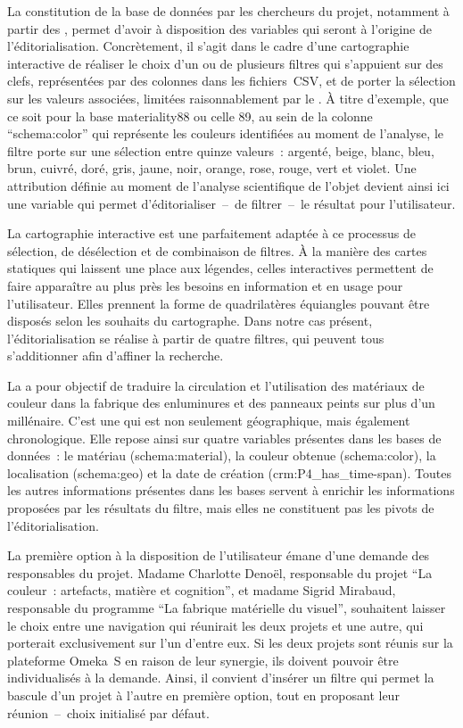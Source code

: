 La constitution de la base de données par les chercheurs du projet, notamment à partir des , permet d’avoir à disposition des variables qui seront à l’origine de l’éditorialisation. Concrètement, il s’agit dans le cadre d’une cartographie interactive de réaliser le choix d’un ou de plusieurs filtres qui s’appuient sur des clefs, représentées par des colonnes dans les fichiers~CSV, et de porter la sélection sur les valeurs associées, limitées raisonnablement par le . À titre d’exemple, que ce soit pour la base materiality88 ou celle 89, au sein de la colonne \enquote{schema:color} qui représente les couleurs identifiées au moment de l’analyse, le filtre porte sur une sélection entre quinze valeurs~: argenté, beige, blanc, bleu, brun, cuivré, doré, gris, jaune, noir, orange, rose, rouge, vert et violet. Une attribution définie au moment de l’analyse scientifique de l’objet devient ainsi ici une variable qui permet d’éditorialiser~–~de filtrer~–~le résultat pour l’utilisateur.\par
La cartographie interactive est une  parfaitement adaptée à ce processus de sélection, de désélection et de combinaison de filtres. À la manière des cartes statiques qui laissent une place aux légendes, celles interactives permettent de faire apparaître au plus près les besoins en information et en usage pour l’utilisateur. Elles prennent la forme de quadrilatères équiangles pouvant être disposés selon les souhaits du cartographe. Dans notre cas présent, l’éditorialisation se réalise à partir de quatre filtres, qui peuvent tous s’additionner afin d’affiner la recherche.\\\par
La  a pour objectif de traduire la circulation et l’utilisation des matériaux de couleur dans la fabrique des enluminures et des panneaux peints sur plus d’un millénaire. C’est une  qui est non seulement géographique, mais également chronologique. Elle repose ainsi sur quatre variables présentes dans les bases de données~: le matériau (schema:material), la couleur obtenue (schema:color), la localisation (schema:geo) et la date de création (crm:P4\_has\_time-span). Toutes les autres informations présentes dans les bases servent à enrichir les informations proposées par les résultats du filtre, mais elles ne constituent pas les pivots de l’éditorialisation.\par
La première option à la disposition de l’utilisateur émane d’une demande des responsables du projet. Madame Charlotte Denoël, responsable du projet \enquote{La couleur~: artefacts, matière et cognition}, et madame Sigrid Mirabaud, responsable du programme \enquote{La fabrique matérielle du visuel}, souhaitent laisser le choix entre une navigation qui réunirait les deux projets et une autre, qui porterait exclusivement sur l’un d’entre eux. Si les deux projets sont réunis sur la plateforme Omeka~S en raison de leur synergie, ils doivent pouvoir être individualisés à la demande. Ainsi, il convient d’insérer un filtre qui permet la bascule d’un projet à l’autre en première option, tout en proposant leur réunion~–~choix initialisé par défaut.\par

